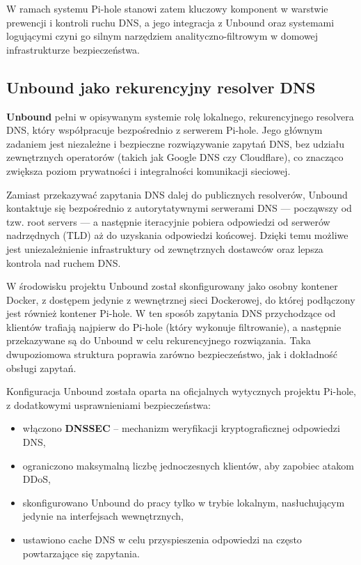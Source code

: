 \documentclass[
    left=2.5cm,         %
    right=2.5cm,        %
    top=2.5cm,          %
    bottom=3cm,         %
    bindingoffset=6mm,  %
    nohyphenation=true %
]{eiti/eiti-thesis} %
\begin{document}
W ramach systemu Pi-hole stanowi zatem kluczowy komponent w warstwie prewencji i kontroli ruchu DNS, a jego integracja z Unbound oraz systemami logującymi czyni go silnym narzędziem analityczno-filtrowym w domowej infrastrukturze bezpieczeństwa.

\subsection{Unbound jako rekurencyjny resolver DNS}

\textbf{Unbound}\cite{unbound-docs} pełni w opisywanym systemie rolę lokalnego, rekurencyjnego resolvera DNS, który współpracuje bezpośrednio z serwerem Pi-hole. Jego głównym zadaniem jest niezależne i bezpieczne rozwiązywanie zapytań DNS\cite{dns-wikipedia}, bez udziału zewnętrznych operatorów (takich jak Google DNS czy Cloudflare), co znacząco zwiększa poziom prywatności i integralności komunikacji sieciowej.

Zamiast przekazywać zapytania DNS dalej do publicznych resolverów, Unbound kontaktuje się bezpośrednio z autorytatywnymi serwerami DNS — począwszy od tzw. root servers — a następnie iteracyjnie pobiera odpowiedzi od serwerów nadrzędnych (TLD)\cite{tld-wikipedia} aż do uzyskania odpowiedzi końcowej. Dzięki temu możliwe jest uniezależnienie infrastruktury od zewnętrznych dostawców oraz lepsza kontrola nad ruchem DNS.

W środowisku projektu Unbound został skonfigurowany jako osobny kontener Docker, z dostępem jedynie z wewnętrznej sieci Dockerowej, do której podłączony jest również kontener Pi-hole\cite{config-unbound}. W ten sposób zapytania DNS przychodzące od klientów trafiają najpierw do Pi-hole (który wykonuje filtrowanie), a następnie przekazywane są do Unbound w celu rekurencyjnego rozwiązania. Taka dwupoziomowa struktura poprawia zarówno bezpieczeństwo, jak i dokładność obsługi zapytań.

Konfiguracja Unbound została oparta na oficjalnych wytycznych projektu Pi-hole, z dodatkowymi usprawnieniami bezpieczeństwa:
\begin{itemize}
    \item włączono \textbf{DNSSEC}\cite{dnssec-wikipedia} – mechanizm weryfikacji kryptograficznej odpowiedzi DNS,
    \item ograniczono maksymalną liczbę jednoczesnych klientów, aby zapobiec atakom DDoS,
    \item skonfigurowano Unbound do pracy tylko w trybie lokalnym, nasłuchującym jedynie na interfejsach wewnętrznych,
    \item ustawiono cache DNS w celu przyspieszenia odpowiedzi na często powtarzające się zapytania.
\end{itemize}
\end{document}
